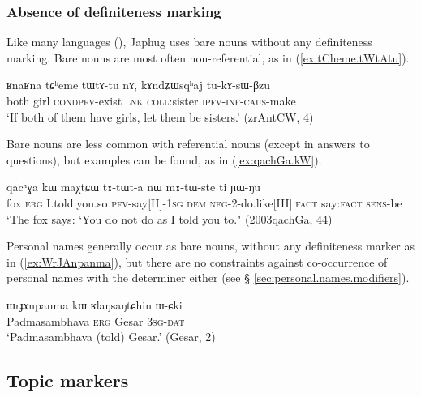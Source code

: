 \subsubsection{Absence of definiteness marking}
Like many languages (\citealt[130]{creissels06sgit1}), Japhug uses bare nouns without any definiteness marking. Bare nouns are most often non-referential, as  in (\ref{ex:tCheme.tWtAtu}).

\begin{exe}
\ex \label{ex:tCheme.tWtAtu}
\gll ʁnaʁna tɕʰeme tɯ\redp{}tɤ-tu nɤ, kɤndʑɯsqʰaj tu-kɤ-sɯ-βzu \\
both girl \textsc{cond}\redp{}\textsc{pfv}-exist \textsc{lnk} \textsc{coll}:sister \textsc{ipfv}-\textsc{inf}-\textsc{caus}-make \\
\glt `If both of them have girls, let them be sisters.' (zrAntCW, 4)
\end{exe}

Bare nouns are less common with referential nouns (except in answers to questions), but examples can be found, as  in (\ref{ex:qachGa.kW}).

\begin{exe}
\ex \label{ex:qachGa.kW}
\gll qacʰɣa 	kɯ maχtɕɯ tɤ-tɯt-a nɯ mɤ-tɯ-ste ti ɲɯ-ŋu \\
fox \textsc{erg} I.told.you.so \textsc{pfv}-say[II]-\textsc{1sg} \textsc{dem} \textsc{neg}-2-do.like[III]:\textsc{fact} say:\textsc{fact} \textsc{sens}-be \\
\glt `The fox says: `You do not do as I told you to." (2003qachGa, 44)
\end{exe}

Personal names generally occur as bare nouns, without any definiteness marker as in (\ref{ex:WrJAnpanma}), but there are no constraints against co-occurrence of personal names with the determiner  either (see § \ref{sec:personal.names.modifiers}).

\begin{exe}
\ex \label{ex:WrJAnpanma}
\gll  ɯrɟɤnpanma kɯ ʁlaŋsaŋtɕhin ɯ-ɕki  \\
 Padmasambhava \textsc{erg} Gesar \textsc{3sg}-\textsc{dat} \\
\glt `Padmasambhava (told) Gesar.' (Gesar, 2)
\end{exe}

 \subsection{Topic markers} \label{sec:topic}
 
